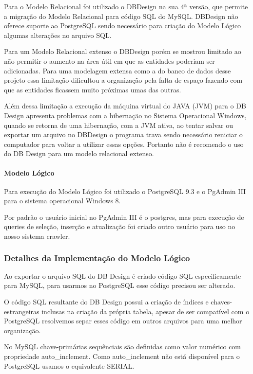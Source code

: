 \documentclass[12pt]{article}
\begin{document}
Para o Modelo Relacional foi utilizado o DBDesign na sua 4ª versão, que permite a migração do Modelo Relacional para código SQL do MySQL. DBDesign não oferece suporte ao PostgreSQL sendo necessário para criação do Modelo Lógico algumas alterações no arquivo SQL. 

Para um Modelo Relacional extenso o DBDesign porém se mostrou limitado ao não permitir o aumento na área útil em que as entidades poderiam ser adicionadas. Para uma modelagem extensa como a do banco de dados desse projeto essa limitação dificultou a organização pela falta de espaço fazendo com que as entidades ficassem muito próximas umas das outras. 

Além dessa limitação a execução da máquina virtual do JAVA (JVM) para o DB Design apresenta problemas com a hibernação no Sistema Operacional Windows, quando se retorna de uma hibernação, com a JVM ativa, ao tentar salvar ou exportar um arquivo no DBDesign o programa trava sendo necessário reniciar o computador para voltar a utilizar essas opções. Portanto não é recomendo o uso do DB Design para um modelo relacional extenso. 

\paragraph{Modelo Lógico\newline}

Para execução do Modelo Lógico foi utilizado o PostgreSQL 9.3 e o PgAdmin III para o sistema operacional Windows 8. 

Por padrão o usuário inicial no PgAdmin III é o postgres, mas para execução de queries de seleção, inserção e atualização foi criado outro usuário para uso no nosso sistema crawler. 

\subsubsection{Detalhes da Implementação do Modelo Lógico}

Ao exportar o arquivo SQL do DB Design é criado código SQL especificamente para MySQL, para usarmos no PostgreSQL esse código precisou ser alterado.

O código SQL resultante do DB Design possui a criação de índices e chaves-estrangeiras inclusas na criação da própria tabela, apesar de ser compatível com o PostgreSQL resolvemos separ esses código em outros arquivos para uma melhor organização.

No MySQL chave-primárias sequênciais são definidas como valor numérico com propriedade auto\_inclement. Como auto\_inclement não está disponível para o PostgreSQL usamos o equivalente SERIAL.
\end{document}
